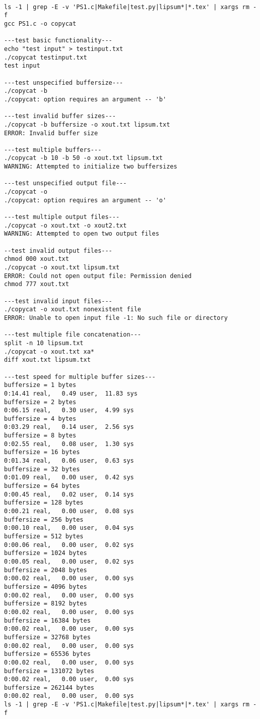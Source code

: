 \documentclass[12pt]{article}
\begin{document}
\begin{lstlisting}

ls -1 | grep -E -v 'PS1.c|Makefile|test.py|lipsum*|*.tex' | xargs rm -f
gcc PS1.c -o copycat

---test basic functionality---
echo "test input" > testinput.txt
./copycat testinput.txt
test input

---test unspecified buffersize---
./copycat -b
./copycat: option requires an argument -- 'b'

---test invalid buffer sizes---
./copycat -b buffersize -o xout.txt lipsum.txt
ERROR: Invalid buffer size

---test multiple buffers---
./copycat -b 10 -b 50 -o xout.txt lipsum.txt
WARNING: Attempted to initialize two buffersizes

---test unspecified output file---
./copycat -o
./copycat: option requires an argument -- 'o'

---test multiple output files---
./copycat -o xout.txt -o xout2.txt
WARNING: Attempted to open two output files

--test invalid output files---
chmod 000 xout.txt
./copycat -o xout.txt lipsum.txt
ERROR: Could not open output file: Permission denied
chmod 777 xout.txt

---test invalid input files---
./copycat -o xout.txt nonexistent file
ERROR: Unable to open input file -1: No such file or directory

---test multiple file concatenation---
split -n 10 lipsum.txt
./copycat -o xout.txt xa*
diff xout.txt lipsum.txt

---test speed for multiple buffer sizes---
buffersize = 1 bytes
0:14.41 real,	0.49 user,	11.83 sys
buffersize = 2 bytes
0:06.15 real,	0.30 user,	4.99 sys
buffersize = 4 bytes
0:03.29 real,	0.14 user,	2.56 sys
buffersize = 8 bytes
0:02.55 real,	0.08 user,	1.30 sys
buffersize = 16 bytes
0:01.34 real,	0.06 user,	0.63 sys
buffersize = 32 bytes
0:01.09 real,	0.00 user,	0.42 sys
buffersize = 64 bytes
0:00.45 real,	0.02 user,	0.14 sys
buffersize = 128 bytes
0:00.21 real,	0.00 user,	0.08 sys
buffersize = 256 bytes
0:00.10 real,	0.00 user,	0.04 sys
buffersize = 512 bytes
0:00.06 real,	0.00 user,	0.02 sys
buffersize = 1024 bytes
0:00.05 real,	0.00 user,	0.02 sys
buffersize = 2048 bytes
0:00.02 real,	0.00 user,	0.00 sys
buffersize = 4096 bytes
0:00.02 real,	0.00 user,	0.00 sys
buffersize = 8192 bytes
0:00.02 real,	0.00 user,	0.00 sys
buffersize = 16384 bytes
0:00.02 real,	0.00 user,	0.00 sys
buffersize = 32768 bytes
0:00.02 real,	0.00 user,	0.00 sys
buffersize = 65536 bytes
0:00.02 real,	0.00 user,	0.00 sys
buffersize = 131072 bytes
0:00.02 real,	0.00 user,	0.00 sys
buffersize = 262144 bytes
0:00.02 real,	0.00 user,	0.00 sys
ls -1 | grep -E -v 'PS1.c|Makefile|test.py|lipsum*|*.tex' | xargs rm -f
\end{lstlisting}
\end{document}
